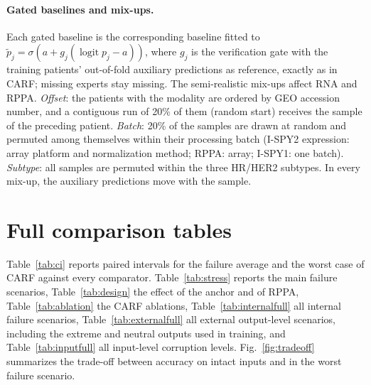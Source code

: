 \documentclass[a4paper,runningheads]{llncs}
\newcommand{\logit}{\operatorname{logit}}
\begin{document}
\paragraph{Gated baselines and mix-ups.} Each gated baseline is the corresponding baseline fitted to $\tilde p_j=\sigma(a+g_j(\logit p_j-a))$, where $g_j$ is the verification gate with the training patients' out-of-fold auxiliary predictions as reference, exactly as in CARF; missing experts stay missing. The semi-realistic mix-ups affect RNA and RPPA. \emph{Offset}: the patients with the modality are ordered by GEO accession number, and a contiguous run of 20\% of them (random start) receives the sample of the preceding patient. \emph{Batch}: 20\% of the samples are drawn at random and permuted among themselves within their processing batch (I-SPY2 expression: array platform and normalization method; RPPA: array; I-SPY1: one batch). \emph{Subtype}: all samples are permuted within the three HR/HER2 subtypes. In every mix-up, the auxiliary predictions move with the sample.

\section{Full comparison tables}

Table~\ref{tab:ci} reports paired intervals for the failure average and the worst case of CARF against every comparator. Table~\ref{tab:stress} reports the main failure scenarios, Table~\ref{tab:design} the effect of the anchor and of RPPA, Table~\ref{tab:ablation} the CARF ablations, Table~\ref{tab:internalfull} all internal failure scenarios, Table~\ref{tab:externalfull} all external output-level scenarios, including the extreme and neutral outputs used in training, and Table~\ref{tab:inputfull} all input-level corruption levels. Fig.~\ref{fig:tradeoff} summarizes the trade-off between accuracy on intact inputs and in the worst failure scenario.

\begin{table}[h]
\centering
\caption{CARF minus comparator, failure-average and worst-case AUROC: point estimate and 95\% interval (internal: corrected resampled $t$ over 25 folds; external: 2{,}000 paired patient bootstrap resamples with realizations held fixed). Positive values favor CARF.}
\label{tab:ci}
\setlength{\tabcolsep}{3pt}
\end{table}

\begin{table}[h]
\centering
\caption{AUROC under failure of one optional modality (sw.: sample swap; miss.: removed). Internal: mean over 25 folds with 5 realizations each ($n=\NDev$). External: mean of 30 realizations ($n=\NExt$); input-level corruptions are applied to the inputs of the frozen experts. Bold: best fusion model.}
\label{tab:stress}
\setlength{\tabcolsep}{3pt}
\end{table}
\end{document}
